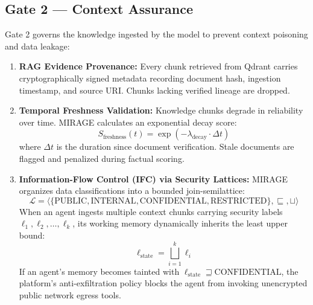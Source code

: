 \documentclass[11pt,a4paper]{article}
\begin{document}
\subsection{Gate 2 — Context Assurance}
Gate 2 governs the knowledge ingested by the model to prevent context poisoning and data leakage:
\begin{enumerate}[leftmargin=*,itemsep=2pt]
  \item \textbf{RAG Evidence Provenance:} Every chunk retrieved from Qdrant carries cryptographically signed metadata recording document hash, ingestion timestamp, and source URI. Chunks lacking verified lineage are dropped.
  \item \textbf{Temporal Freshness Validation:} Knowledge chunks degrade in reliability over time. MIRAGE calculates an exponential decay score:
  \begin{equation}
    S_{\text{freshness}}(t) = \exp\left(-\lambda_{\text{decay}} \cdot \Delta t\right)
  \end{equation}
  where $\Delta t$ is the duration since document verification. Stale documents are flagged and penalized during factual scoring.
  \item \textbf{Information-Flow Control (IFC) via Security Lattices:} MIRAGE organizes data classifications into a bounded join-semilattice:
  \begin{equation}
    \mathcal{L} = \langle \{\text{PUBLIC}, \text{INTERNAL}, \text{CONFIDENTIAL}, \text{RESTRICTED}\}, \sqsubseteq, \sqcup \rangle
  \end{equation}
  When an agent ingests multiple context chunks carrying security labels $\ell_1, \ell_2, \dots, \ell_k$, its working memory dynamically inherits the least upper bound:
  \begin{equation}
    \ell_{\text{state}} = \bigsqcup_{i=1}^k \ell_i
  \end{equation}
  If an agent's memory becomes tainted with $\ell_{\text{state}} \sqsupseteq \text{CONFIDENTIAL}$, the platform's anti-exfiltration policy blocks the agent from invoking unencrypted public network egress tools.
\end{enumerate}
\end{document}
